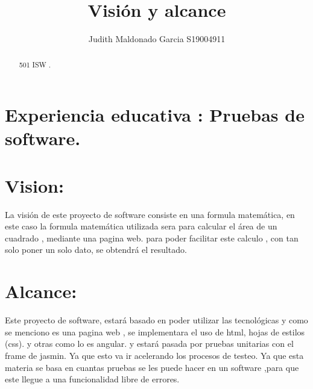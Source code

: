 \documentclass{article}
\title{Visión y alcance }
\author{Judith Maldonado Garcia S19004911 }
\begin{document}
\maketitle

\begin{abstract}

501 ISW .
\end{abstract}

\section{Experiencia educativa : 
Pruebas de software. }

\section{Vision: }
La visión de este proyecto de software consiste en una formula matemática, en este caso la formula matemática utilizada sera para calcular el área de un cuadrado , mediante una pagina web. para poder facilitar este calculo , con tan solo poner un solo dato, se obtendrá el resultado.
\section{Alcance: }
Este proyecto de software, estará basado en  poder utilizar las tecnológicas y  como se menciono es una pagina web , se implementara el uso de html, hojas de estilos (css). y otras como lo es angular. y estará pasada por pruebas unitarias con el frame de jasmin. Ya que esto va ir acelerando los procesos de testeo.  Ya que esta materia se basa en cuantas pruebas se les puede hacer en un software ,para que este llegue a una funcionalidad libre de errores.  
\end{document}
